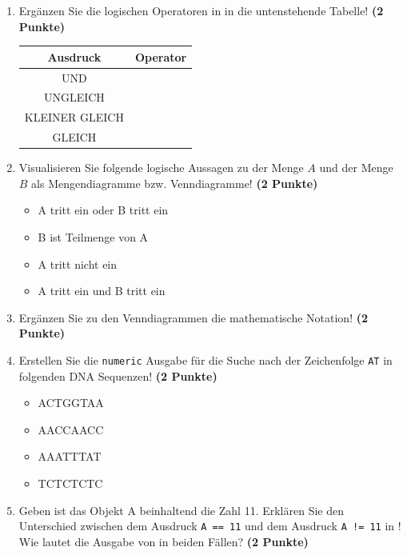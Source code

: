 \documentclass[a4paper, 10pt]{scrartcl}\usepackage[]{graphicx}\usepackage[]{xcolor}
\begin{document}
\vspace{1Ex}



\begin{enumerate}
\item Erg{\"a}nzen Sie die logischen Operatoren in \Rlogo in die untenstehende Tabelle!
  \textbf{(2 Punkte)}
  \begin{center}
    \begin{tabular}{c|c}
      \textbf{Ausdruck} & \textbf{Operator} \strut\\ \hline
      UND  & \phantom{UND}\strut\\ \hline
      UNGLEICH  & \phantom{UNGLEICH}\strut\\ \hline
      KLEINER GLEICH  & \phantom{KLEINER GLEICH}\strut\\ \hline
      GLEICH  & \phantom{GLEICH}\strut\\ 
    \end{tabular}
  \end{center}  
\item Visualisieren Sie folgende logische Aussagen zu der Menge $A$ und der Menge
  $B$ als Mengendiagramme bzw. Venndiagramme!
  \textbf{(2 Punkte)}
  \begin{itemize}
  \item A tritt ein oder B tritt ein
  \item B ist Teilmenge von A
  \item A tritt nicht ein
  \item A tritt ein und B tritt ein
  \end{itemize}
\item Erg{\"a}nzen Sie zu den Venndiagrammen die mathematische Notation!
  \textbf{(2 Punkte)}
\item Erstellen Sie die \texttt{numeric} \Rlogo Ausgabe f{\"u}r die
  Suche nach der Zeichenfolge \texttt{AT} in folgenden DNA
  Sequenzen! \textbf{(2 Punkte)}
  \begin{itemize}
  \item ACTGGTAA
  \item AACCAACC
  \item AAATTTAT
  \item TCTCTCTC
  \end{itemize}
\item Geben ist das \Rlogo Objekt A beinhaltend die Zahl
  11. Erkl{\"a}ren Sie den Unterschied zwischen dem Ausdruck \texttt{A == 11}
  und dem Ausdruck \texttt{A != 11} in \Rlogo! Wie lautet die Ausgabe von \Rlogo
  in beiden F{\"a}llen? \textbf{(2 Punkte)}
\end{enumerate}
\end{document}
